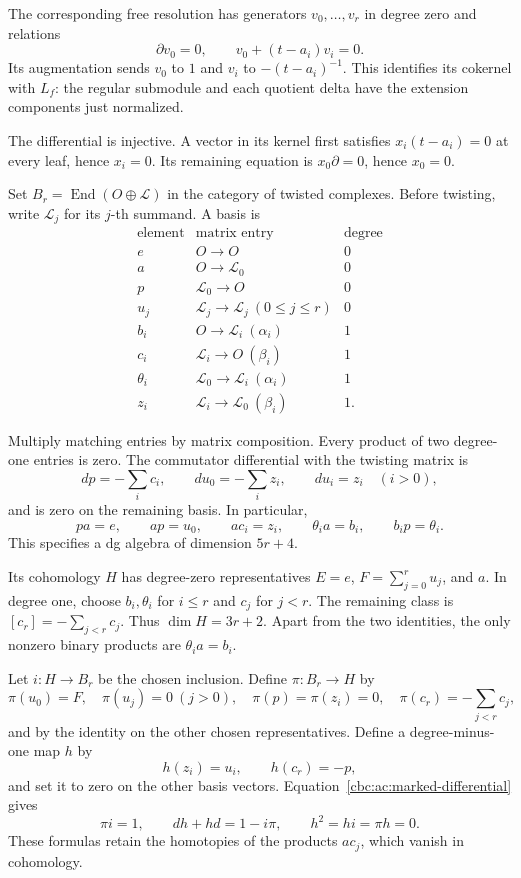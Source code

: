 The corresponding free resolution has generators
$v_0,\ldots,v_r$ in degree zero and relations
\[
 \partial v_0=0,\qquad v_0+(t-a_i)v_i=0.
\]
Its augmentation sends $v_0$ to $1$ and $v_i$ to
$-(t-a_i)^{-1}$. This identifies its cokernel with $L_f$:
the regular submodule and each quotient delta have the
extension components just normalized.

The differential
is injective. A vector in its kernel first satisfies
$x_i(t-a_i)=0$ at every leaf, hence $x_i=0$.
Its remaining equation is $x_0\partial=0$, hence $x_0=0$.

Set $B_r=\operatorname{End}(O\oplus\mathcal L)$ in the
category of twisted complexes. Before twisting, write
$\mathcal L_j$ for its $j$-th summand. A basis is
\[
 \begin{array}{c|c|c}
  \text{element}&\text{matrix entry}&\text{degree}\\ \hline
  e&O\to O&0\\
  a&O\to\mathcal L_0&0\\
  p&\mathcal L_0\to O&0\\
  u_j&\mathcal L_j\to\mathcal L_j\ (0\leq j\leq r)&0\\
  b_i&O\to\mathcal L_i\ (\alpha_i)&1\\
  c_i&\mathcal L_i\to O\ (\beta_i)&1\\
  \theta_i&\mathcal L_0\to\mathcal L_i\ (\alpha_i)&1\\
  z_i&\mathcal L_i\to\mathcal L_0\ (\beta_i)&1 .
 \end{array}
\]

Multiply matching entries by matrix composition. Every
product of two degree-one entries is zero.
The commutator differential with the twisting matrix is
\begin{equation}\label{cbc:ac:marked-differential}
 dp=-\sum_i c_i,\qquad
 du_0=-\sum_i z_i,\qquad du_i=z_i\quad(i>0),
\end{equation}
and is zero on the remaining basis. In particular,
\[
 pa=e,\qquad ap=u_0,\qquad
 ac_i=z_i,\qquad \theta_i a=b_i,\qquad b_i p=\theta_i.
\]
This specifies a dg algebra of dimension $5r+4$.

Its cohomology $H$ has degree-zero representatives
$E=e$, $F=\sum_{j=0}^r u_j$, and $a$. In degree one,
choose $b_i,\theta_i$ for $i\leq r$ and $c_j$ for
$j<r$. The remaining class is
$[c_r]=-\sum_{j<r}c_j$. Thus $\dim H=3r+2$.
Apart from the two identities, the only nonzero binary
products are $\theta_i a=b_i$.

Let $i:H\to B_r$ be the chosen inclusion. Define
$\pi:B_r\to H$ by
\[
 \pi(u_0)=F,\quad \pi(u_j)=0\ (j>0),\quad
 \pi(p)=\pi(z_i)=0,\quad
 \pi(c_r)=-\sum_{j<r}c_j,
\]
and by the identity on the other chosen representatives.
Define a degree-minus-one map $h$ by
\[
 h(z_i)=u_i,\qquad h(c_r)=-p,
\]
and set it to zero on the other basis vectors.
Equation~\eqref{cbc:ac:marked-differential} gives
\[
 \pi i=1,\qquad dh+hd=1-i\pi,\qquad
 h^2=hi=\pi h=0.
\]
These formulas retain the homotopies of the products
$ac_j$, which vanish in cohomology.

